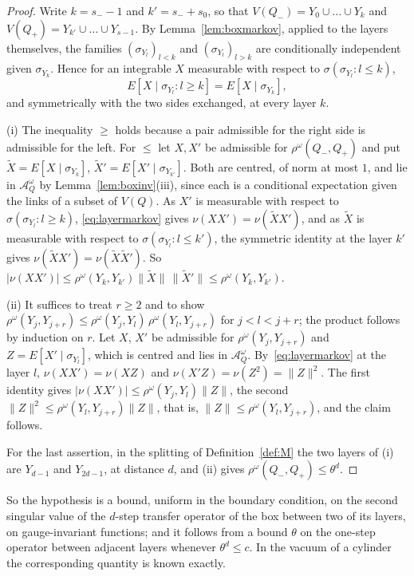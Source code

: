 \begin{proof}
Write $k=s_--1$ and $k'=s_-+s_0$, so that $V(Q_-)=Y_0\cup\dots\cup Y_k$ and
$V(Q_+)=Y_{k'}\cup\dots\cup Y_{s-1}$. By Lemma~\ref{lem:boxmarkov}, applied
to the layers themselves, the families $(\sigma_{Y_l})_{l<k}$ and
$(\sigma_{Y_l})_{l>k}$ are conditionally independent given $\sigma_{Y_k}$.
Hence for an integrable $X$ measurable with respect to
$\sigma(\sigma_{Y_l}:l\le k)$,
\begin{equation}\label{eq:layermarkov}
E[X\mid\sigma_{Y_l}:l\ge k]=E[X\mid\sigma_{Y_k}],
\end{equation}
and symmetrically with the two sides exchanged, at every layer $k$.

(i) The inequality $\ge$ holds because a pair admissible for the right side
is admissible for the left. For $\le$ let $X,X'$ be admissible for
$\rho^\omega(Q_-,Q_+)$ and put $\tilde X=E[X\mid\sigma_{Y_k}]$, $\tilde
X'=E[X'\mid\sigma_{Y_{k'}}]$. Both are centred, of norm at most $1$, and lie
in $\mathcal A^\omega_Q$ by Lemma~\ref{lem:boxinv}(iii), since each is a
conditional expectation given the links of a subset of $V(Q)$. As $X'$ is
measurable with respect to $\sigma(\sigma_{Y_l}:l\ge k)$,
\eqref{eq:layermarkov} gives $\nu(XX')=\nu(\tilde XX')$, and as $\tilde X$ is
measurable with respect to $\sigma(\sigma_{Y_l}:l\le k')$, the symmetric
identity at the layer $k'$ gives $\nu(\tilde XX')=\nu(\tilde X\tilde X')$. So
$|\nu(XX')|\le\rho^\omega(Y_k,Y_{k'})\|\tilde X\|\,\|\tilde X'\|\le
\rho^\omega(Y_k,Y_{k'})$.

(ii) It suffices to treat $r\ge2$ and to show $\rho^\omega(Y_j,Y_{j+r})\le
\rho^\omega(Y_j,Y_l)\,\rho^\omega(Y_l,Y_{j+r})$ for $j<l<j+r$; the product
follows by induction on $r$. Let $X$, $X'$ be admissible for
$\rho^\omega(Y_j,Y_{j+r})$ and $Z=E[X'\mid\sigma_{Y_l}]$, which is centred
and lies in $\mathcal A^\omega_Q$. By~\eqref{eq:layermarkov} at the layer $l$,
$\nu(XX')=\nu(XZ)$ and $\nu(X'Z)=\nu(Z^2)=\|Z\|^2$. The first identity gives
$|\nu(XX')|\le\rho^\omega(Y_j,Y_l)\|Z\|$, the second $\|Z\|^2\le
\rho^\omega(Y_l,Y_{j+r})\|Z\|$, that is, $\|Z\|\le\rho^\omega(Y_l,Y_{j+r})$,
and the claim follows.

For the last assertion, in the splitting of Definition~\ref{def:M} the two
layers of (i) are $Y_{d-1}$ and $Y_{2d-1}$, at distance $d$, and (ii) gives
$\rho^\omega(Q_-,Q_+)\le\theta^d$.
\end{proof}

So the hypothesis is a bound, uniform in the boundary condition, on the
second singular value of the $d$-step transfer operator of the box between
two of its layers, on gauge-invariant functions; and it follows from a bound
$\theta$ on the one-step operator between adjacent layers whenever
$\theta^d\le c$. In the vacuum of a cylinder the corresponding quantity is
known exactly.

